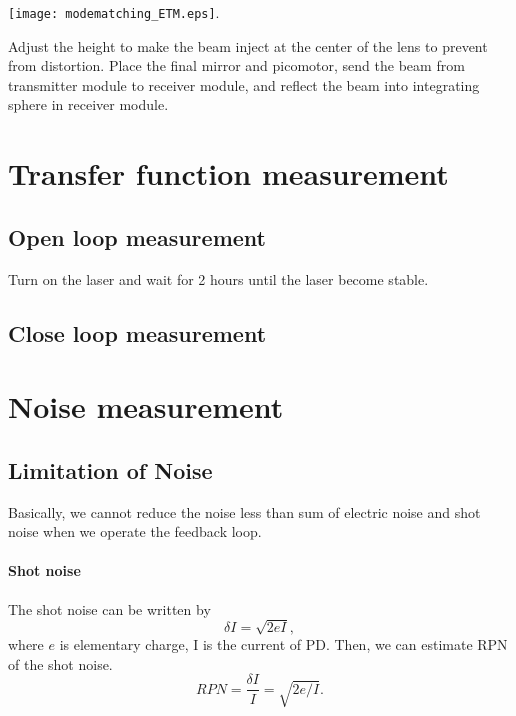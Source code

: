 \begin{center}
	\texttt{[image: modematching\_ETM.eps]}.
\end{center}


Adjust the height to make the beam inject at the center of the lens to prevent from distortion. Place the final mirror and picomotor, send the beam from transmitter module to receiver module, and reflect the beam into integrating sphere in receiver module.

\section{Transfer function measurement}
\subsection{Open loop measurement}
Turn on the laser and wait for 2 hours until the laser become stable. 
\subsection{Close loop measurement}

\section{Noise measurement}
\subsection{Limitation of Noise}
Basically, we cannot reduce the noise less than sum of electric noise and shot noise when we operate the feedback loop.
\paragraph{Shot noise}
The shot noise can be written by
\begin{equation}
\delta I=\sqrt{2eI},
\end{equation}
where $e$ is elementary charge, I is the current of PD. Then, we can estimate RPN of the shot noise.
\begin{equation}
RPN=\frac{\delta I}{I}=\sqrt{2e/I}.
\end{equation}

			\begin{center}
			\end{center}
